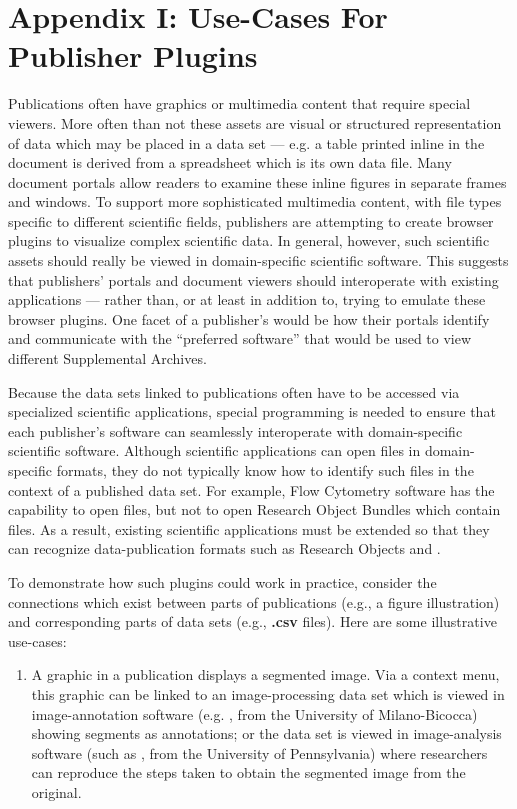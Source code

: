 \documentclass[12pt,letterpaper]{article}
\newcommand{\FCS}{\resizebox{!}{8pt}{\AcronymText{FCS}}}
\newcommand{\CaPTk}{\resizebox{!}{8pt}{\AcronymText{CaPTk}}}
\newcommand{\ATexttclr}[1]{\textcolor{tcolor}{\textbf{#1}}}
\newcommand{\IAT}{\resizebox{!}{8pt}{\AcronymText{IAT}}}
\newcommand{\textscc}[1]{{\color{orr!35!black}{{%
{\textsc{\textbf{#1}}}}}}}
\newcommand{\AcronymText}[1]{{\textscc{#1}}}
\newcommand{\SDRM}{\resizebox{!}{8pt}{\ATexttclr{SDRM}}}
\newcommand{\SDRF}{\resizebox{!}{8pt}{\ATexttclr{S}}\resizebox{!}{8pt}{\ATexttclr{DR%
\hspace{1pt}{\raisebox{-1pt}{\fontfamily{qhv}\fontseries{b}\selectfont{}\Large{F}}%
}}}}
\newcommand{\p}[1]{

\vspace{.7em}#1}
\newcommand{\q}[1]{{\fontfamily{qcr}\selectfont ``}#1{\fontfamily{qcr}\selectfont ''}}
\begin{document}
{\section{Appendix I: Use-Cases For Publisher Plugins}

\p{Publications often have graphics or multimedia content that require special viewers.  More often than not these assets are visual or structured representation of data which may be placed in a data set --- e.g. a table printed inline in the document is derived from a spreadsheet which is its own data file.  Many document portals allow readers to examine these inline figures in separate frames and windows.  To support more sophisticated multimedia content, with file types specific to different scientific fields, publishers are attempting to create browser plugins to visualize complex scientific data.  In general, however, such scientific assets should really be viewed in domain-specific scientific software.  This suggests that publishers' portals and document viewers should interoperate with existing applications --- rather than, or at least in addition to, trying to emulate these 
\makebox{applications via} browser plugins.  One facet of a publisher's \SDRM{} would be how their portals identify and communicate with the \q{preferred software} that would be used to view 
different Supplemental Archives.}

\p{Because the data sets linked to publications often have to be accessed 
via specialized scientific applications, special programming is 
needed to ensure that each publisher's software can seamlessly interoperate 
with domain-specific scientific software.  Although scientific 
applications can open files in domain-specific formats, they do 
not typically know how to identify such files in the context 
of a published data set.  For example, Flow Cytometry 
software has the capability to open \FCS{} files, but not  
to open Research Object Bundles which contain \FCS{} files.  
As a result, existing scientific applications must be 
extended so that they can recognize data-publication formats 
such as Research Objects and \SDRF{}.}

\p{To demonstrate how such plugins could work in practice, consider the connections which exist between parts of publications (e.g., a figure illustration) and corresponding parts of data sets 
(e.g., \textbf{.csv} files).  Here are some illustrative use-cases:

\begin{enumerate}[itemsep=2pt, leftmargin=18pt]
\item{}  A graphic in a publication displays a segmented image.  Via a context menu, this graphic can be linked to an image-processing data set which is viewed in image-annotation software (e.g. 
\IAT{}, from the University of Milano-Bicocca) showing segments as annotations; or the data set is viewed in image-analysis software (such as \CaPTk{}, from the University of Pennsylvania) where researchers can reproduce the steps taken to obtain the segmented image from the original.


\end{enumerate}}}
\end{document}
